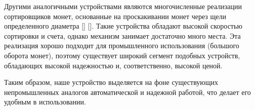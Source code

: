 Другими аналогичными устройствами являются многочисленные реализации сортировщиков монет, основанные на проскакивании монет через щели определенного диаметра [] []. Такие устройства обладают высокой скоростью сортировки и счета, однако механизм занимает достаточно много места. Эта реализация хорошо подходит для промышленного использования (большого оборота монет), поэтому существует широкий сегмент подобных устройств, обладающих высокой надежностью и, соответственно, высокой ценой. 

Таким образом, наше устройство выделяется на фоне существующих непромышленных аналогов автоматической и надежной работой, что делает его удобным в использовании.

